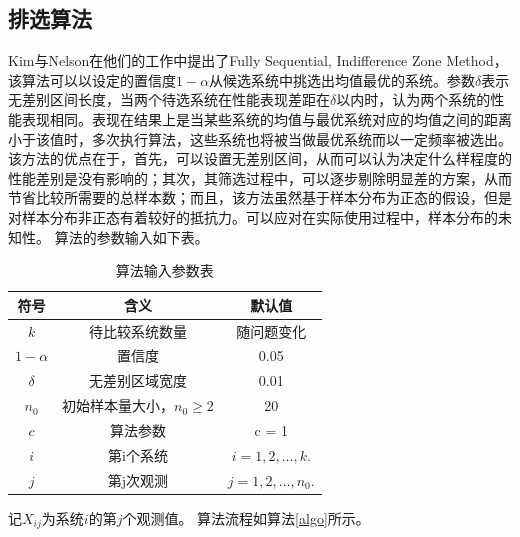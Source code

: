 \documentclass{article}
\begin{document}
\subsection{排选算法}
Kim与Nelson在他们的工作中提出了Fully Sequential, Indifference Zone Method\cite{Kim2001A}，该算法可以以设定的置信度$1-\alpha$从候选系统中挑选出均值最优的系统。参数$\delta$表示无差别区间长度，当两个待选系统在性能表现差距在$\delta$以内时，认为两个系统的性能表现相同。表现在结果上是当某些系统的均值与最优系统对应的均值之间的距离小于该值时，多次执行算法，这些系统也将被当做最优系统而以一定频率被选出。该方法的优点在于，首先，可以设置无差别区间，从而可以认为决定什么样程度的性能差别是没有影响的；其次，其筛选过程中，可以逐步剔除明显差的方案，从而节省比较所需要的总样本数；而且，该方法虽然基于样本分布为正态的假设，但是对样本分布非正态有着较好的抵抗力。可以应对在实际使用过程中，样本分布的未知性。
算法的参数输入如下表。
\begin{table}[H]
    \centering
    \caption{算法输入参数表}
    \begin{tabular}{ |c|c|c| } 
     \hline
     符号 & 含义 & 默认值\\ 
     \hline
     $ k $ & 待比较系统数量 & 随问题变化\\ 
     \hline
     $ 1-\alpha $ & 置信度 & 0.05 \\ 
     \hline
     $ \delta $ & 无差别区域宽度 & 0.01\\ 
     \hline
     $ n_0 $ & 初始样本量大小，$ n_0 \geq 2 $ & 20 \\ 
     \hline
     $ c $ & 算法参数 & c = 1 \\ 
     \hline
     $ i $ & 第i个系统 & $ i = 1, 2, \dots, k. $ \\ 
     \hline
     $ j $ & 第j次观测 & $ j = 1, 2, \dots, n_0. $ \\ 
     \hline
    \end{tabular}
    \label{tablerv}
\end{table}
记$X_{ij}$为系统$i$的第$j$个观测值。
算法流程如算法\ref{algo}所示。
\end{document}

